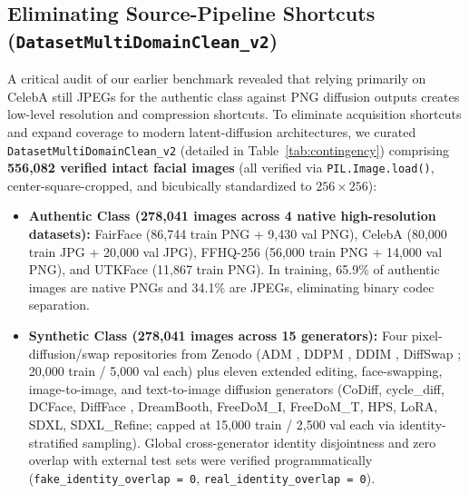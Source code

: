 \documentclass[fleqn,10pt]{wlscirep}
\begin{document}
\subsection*{Eliminating Source-Pipeline Shortcuts (\texttt{DatasetMultiDomainClean\_v2})}
A critical audit of our earlier benchmark revealed that relying primarily on CelebA still JPEGs for the authentic class against PNG diffusion outputs creates low-level resolution and compression shortcuts. To eliminate acquisition shortcuts and expand coverage to modern latent-diffusion architectures, we curated \texttt{DatasetMultiDomainClean\_v2} (detailed in Table~\ref{tab:contingency}) comprising \textbf{556,082 verified intact facial images} (all verified via \texttt{PIL.Image.load()}, center-square-cropped, and bicubically standardized to $256\times 256$):
\begin{itemize}
    \item \textbf{Authentic Class (278,041 images across 4 native high-resolution datasets):} FairFace \cite{ref46} (86,744 train PNG + 9,430 val PNG), CelebA \cite{ref36} (80,000 train JPG + 20,000 val JPG), FFHQ-256 \cite{ref47} (56,000 train PNG + 14,000 val PNG), and UTKFace \cite{ref48} (11,867 train PNG). In training, 65.9\% of authentic images are native PNGs and 34.1\% are JPEGs, eliminating binary codec separation.
    \item \textbf{Synthetic Class (278,041 images across 15 generators):} Four pixel-diffusion/swap repositories from Zenodo \cite{ref9,ref10} (ADM \cite{ref3}, DDPM \cite{ref1}, DDIM \cite{ref2}, DiffSwap \cite{ref16}; 20,000 train / 5,000 val each) plus eleven extended editing, face-swapping, image-to-image, and text-to-image diffusion generators (CoDiff, cycle\_diff, DCFace, DiffFace \cite{ref21}, DreamBooth, FreeDoM\_I, FreeDoM\_T, HPS, LoRA, SDXL, SDXL\_Refine; capped at 15,000 train / 2,500 val each via identity-stratified sampling). Global cross-generator identity disjointness and zero overlap with external test sets were verified programmatically (\texttt{fake\_identity\_overlap = 0}, \texttt{real\_identity\_overlap = 0}).
\end{itemize}
\end{document}
